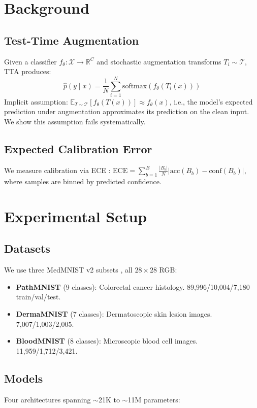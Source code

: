 \documentclass{article}
\theoremstyle{plain}
\theoremstyle{definition}
\theoremstyle{remark}
\begin{document}
\section{Background}
\label{sec:background}

\subsection{Test-Time Augmentation}
Given a classifier $f_\theta: \mathcal{X} \to \mathbb{R}^C$ and stochastic augmentation transforms $T_i \sim \mathcal{T}$, TTA produces:
\begin{equation}
    \hat{p}(y \mid x) = \frac{1}{N} \sum_{i=1}^{N} \text{softmax}(f_\theta(T_i(x)))
    \label{eq:tta}
\end{equation}
Implicit assumption: $\mathbb{E}_{T \sim \mathcal{T}}[f_\theta(T(x))] \approx f_\theta(x)$, i.e., the model's expected prediction under augmentation approximates its prediction on the clean input. We show this assumption fails systematically.

\subsection{Expected Calibration Error}
We measure calibration via ECE \citep{guo2017calibration}:
$\text{ECE} = \sum_{b=1}^{B} \frac{|B_b|}{N} |\text{acc}(B_b) - \text{conf}(B_b)|$, where samples are binned by predicted confidence.

\section{Experimental Setup}
\label{sec:setup}

\subsection{Datasets}
We use three MedMNIST v2 subsets \citep{yang2023medmnist}, all $28 \times 28$ RGB:
\begin{itemize}
    \item \textbf{PathMNIST} (9 classes): Colorectal cancer histology. 89,996/10,004/7,180 train/val/test.
    \item \textbf{DermaMNIST} (7 classes): Dermatoscopic skin lesion images. 7,007/1,003/2,005.
    \item \textbf{BloodMNIST} (8 classes): Microscopic blood cell images. 11,959/1,712/3,421.
\end{itemize}

\subsection{Models}
Four architectures spanning $\sim$21K to $\sim$11M parameters:
\end{document}
